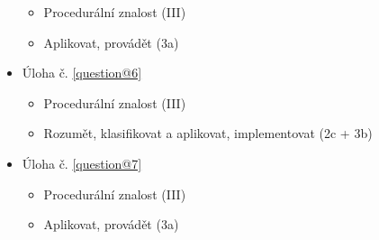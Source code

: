 \documentclass[12pt,a4paper,addpoints]{exam}
\begin{document}
\begin{titlepage}
\begin{center}
\begin{itemize}[noitemsep,topsep=0pt]
                                \begin{itemize}[noitemsep,topsep=0pt]
                                        \item Procedurální znalost (III)
                                        \item Aplikovat, provádět (3a)
                                \end{itemize}
                        \item Úloha č. \ref{question@6}\\
                                \begin{itemize}[noitemsep,topsep=0pt]
                                        \item Procedurální znalost (III)
                                        \item Rozumět, klasifikovat a aplikovat, implementovat (2c + 3b)
                                \end{itemize}
                        \item Úloha č. \ref{question@7}\\
                                \begin{itemize}[noitemsep,topsep=0pt]
                                        \item Procedurální znalost (III)
                                        \item Aplikovat, provádět (3a)
                                \end{itemize}
                        \end{itemize}
        \end{center}
    \end{titlepage}

    
    

    \printanswers
    
    
\end{document}
